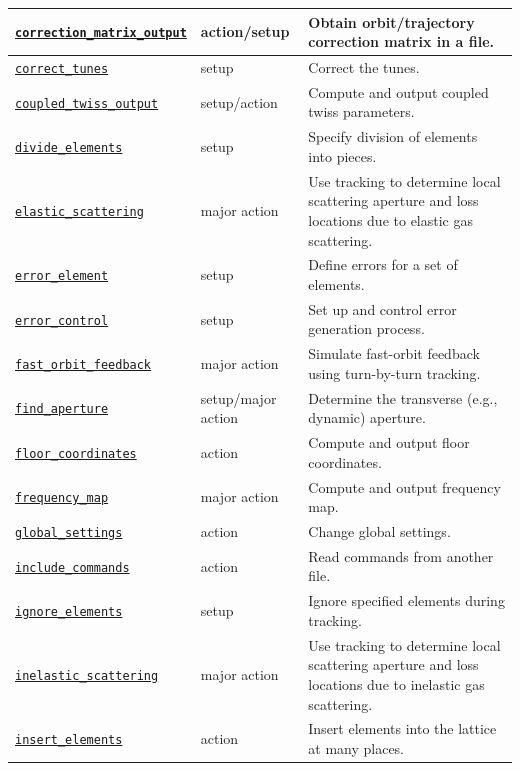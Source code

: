 \documentclass[11pt]{article}
\begin{document}
\begin{longtable}{|p{2.75in}|p{0.75in}|p{2.75in}|}
\hyperref[subsec:correctionmatrixoutput]{\tt correction\_matrix\_output} & action/setup & Obtain orbit/trajectory correction matrix in a file. \\ \hline
\hyperref[subsec:correcttunes]{\tt correct\_tunes} & setup & Correct the tunes. \\ \hline
\hyperref[subsec:coupledtwissoutput]{\tt coupled\_twiss\_output} & setup/action & Compute and output coupled twiss parameters. \\ \hline
\hyperref[subsec:divideelements]{\tt divide\_elements} & setup & Specify division of elements into pieces. \\ \hline
\hyperref[subsec:elasticscattering]{\tt elastic\_scattering} & major action & Use tracking to determine local scattering aperture and loss locations due to elastic gas scattering.\\ \hline
\hyperref[subsec:errorelement]{\tt error\_element} & setup & Define errors for a set of elements. \\ \hline
\hyperref[subsec:errorcontrol]{\tt error\_control} & setup & Set up and control error generation process. \\ \hline
\hyperref[subsec:fastorbitfeedback]{\tt fast\_orbit\_feedback} & major action & Simulate fast-orbit feedback using turn-by-turn tracking. \\ \hline
\hyperref[subsec:findaperture]{\tt find\_aperture} & setup/major action & Determine the transverse (e.g., dynamic) aperture. \\ \hline
\hyperref[subsec:floorcoordinates]{\tt floor\_coordinates} & action & Compute and output floor coordinates. \\ \hline
\hyperref[subsec:frequencymap]{\tt frequency\_map} & major action & Compute and output frequency map. \\ \hline
\hyperref[subsec:globalsettings]{\tt global\_settings} & action & Change global settings.\\ \hline
\hyperref[subsec:includecommands]{\tt include\_commands} & action & Read commands from another file.\\ \hline
\hyperref[subsec:ignoreelements]{\tt ignore\_elements} & setup & Ignore specified elements during tracking. \\ \hline
\hyperref[subsec:inelasticscattering]{\tt inelastic\_scattering} & major action & Use tracking to determine local scattering aperture and loss locations due to inelastic gas scattering.\\ \hline
\hyperref[subsec:insertelements]{\tt insert\_elements} & action & Insert elements into the lattice at many places. \\ \hline

\end{longtable}
\end{document}
